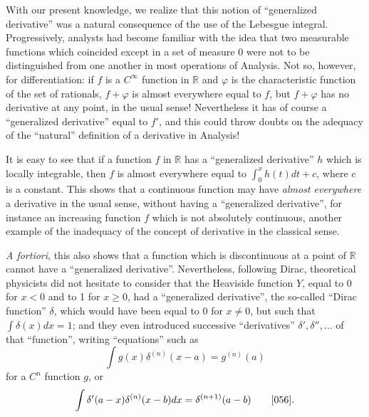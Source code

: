 \documentclass[12pt,a4paper,leqno,twoside]{extbook}
\newcommand{\R}{\mathbb{R}}
\begin{document}
With our present knowledge, we realize that this notion of ``generalized derivative'' was a natural consequence of the use of the Lebesgue integral. Progressively, analysts had become familiar with the idea that two measurable functions which coincided except in a set of measure 0 were not to be distinguished from one another in most operations of Analysis. Not so, however, for differentiation: if \(f\) is a \(C^\infty\) function in \(\R\) and \(\varphi\) is the characteristic function of the set of rationals, \(f + \varphi\) is almost everywhere equal to \(f\), but \(f + \varphi\) has no derivative at any point, in the usual sense! Nevertheless it has of course a ``generalized derivative'' equal to \(f'\), and this could throw doubts on the adequacy of the ``natural'' definition of a derivative in Analysis!

It is easy to see that if a function \(f\) in \(\R\) has a ``generalized derivative'' \(h\) which is locally integrable, then \(f\) is almost everywhere equal to \(\int_0^x h(t)dt + c\), where \(c\) is a constant. This shows that a continuous function may have \emph{almost everywhere} a derivative in the usual sense, without having a ``generalized derivative'', for instance an increasing function \(f\) which is not absolutely continuous, another example of the inadequacy of the concept of derivative in the classical sense.

\emph{A fortiori}, this also shows that a function which is discontinuous at a point of \(\R\) cannot have a ``generalized derivative''. Nevertheless, following Dirac, theoretical physicists did not hesitate to consider that the Heaviside function \(Y\), equal to 0 for \(x < 0\) and to 1 for \(x \geq 0\), had a ``generalized derivative'', the so-called ``Dirac function'' \(\delta\), which would have been equal to 0 for \(x \neq 0\), but such that \(\int \delta(x)dx = 1\); and they even introduced successive ``derivatives'' \(\delta', \delta'', \ldots\) of that ``function'', writing ``equations'' such as
\begin{equation}
    \label{eq:8.7}
    \int g(x)\delta^{(n)}(x-a) = g^{(n)}(a)
\end{equation}
for a \(C^n\) function \(g\), or
\begin{equation}
    \label{eq:8.8}
    \int \delta'(a-x) \delta^{(n)}(x-b) dx = \delta^{(n+1)}(a-b)
    \qquad
    \text{\cite{056}}.
\end{equation}
\end{document}
